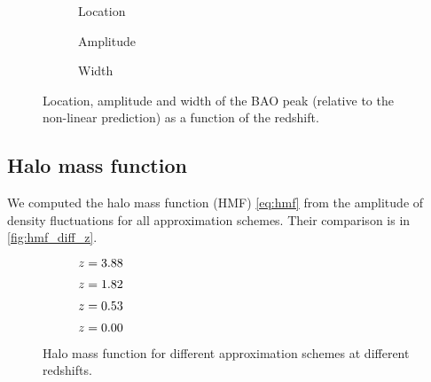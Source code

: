 \begin{figure}
\newcommand{\corrwidth}{0.70}
\centering
	\begin{subfigure}{\corrwidth\textwidth}
	\end{subfigure}
	\begin{subfigure}{\corrwidth\textwidth}
		\centering
		\caption{Location}
	\end{subfigure}
	\begin{subfigure}{\corrwidth\textwidth}
		\centering
		\caption{Amplitude}
	\end{subfigure}
	\begin{subfigure}{\corrwidth\textwidth}
		\centering
		\caption{Width}
	\end{subfigure}
	\caption{Location, amplitude and width of the BAO peak (relative to the non-linear prediction) as a function of the redshift.}
	\label{fig:corr_peak}
\end{figure}

\subsection{Halo mass function}
We computed the halo mass function (HMF) \eqref{eq:hmf} from the amplitude of density fluctuations for all approximation schemes. Their comparison is in \autoref{fig:hmf_diff_z}.

\begin{figure*}
	\centering
		\begin{subfigure}{1.0\textwidth}
		\end{subfigure}
		\begin{subfigure}{0.5\textwidth}
			\caption{$z=3.88$}
		\end{subfigure}%
		\begin{subfigure}{0.5\textwidth}
			\caption{$z=1.82$}
		\end{subfigure}
		\begin{subfigure}{0.5\textwidth}
			\caption{$z=0.53$}
		\end{subfigure}%
		\begin{subfigure}{0.5\textwidth}
			\caption{$z=0.00$}
		\end{subfigure}
		\caption{Halo mass function for different approximation schemes at different redshifts.}
		\label{fig:hmf_diff_z}
	\end{figure*}


